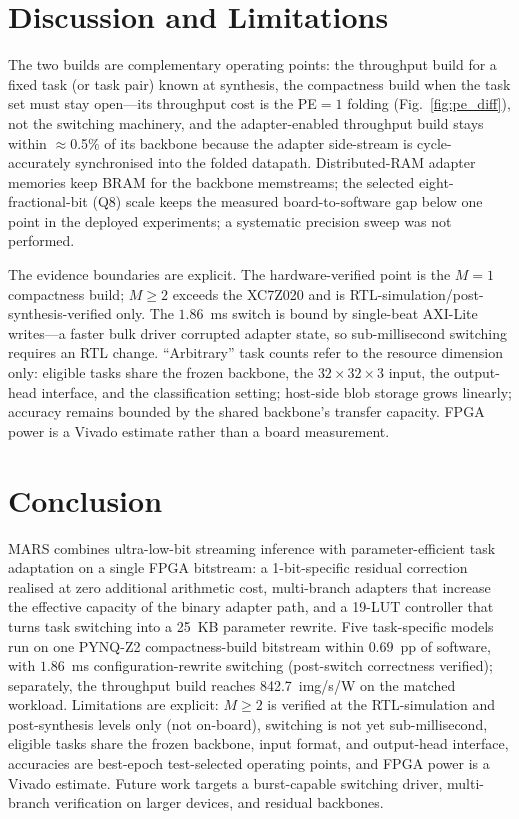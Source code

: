 \documentclass[conference]{IEEEtran}
\begin{document}
\section{Discussion and Limitations}
The two builds are complementary operating points: the throughput build for a fixed task (or task pair) known at synthesis, the compactness build when the task set must stay open---its throughput cost is the PE${=}1$ folding (Fig.~\ref{fig:pe_diff}), not the switching machinery, and the adapter-enabled throughput build stays within $\approx$0.5\% of its backbone because the adapter side-stream is cycle-accurately synchronised into the folded datapath. Distributed-RAM adapter memories keep BRAM for the backbone memstreams; the selected eight-fractional-bit (Q8) scale keeps the measured board-to-software gap below one point in the deployed experiments; a systematic precision sweep was not performed.

The evidence boundaries are explicit. The hardware-verified point is the $M{=}1$ compactness build; $M{\geq}2$ exceeds the XC7Z020 and is RTL-simulation/post-synthesis-verified only. The $1.86$~ms switch is bound by single-beat AXI-Lite writes---a faster bulk driver corrupted adapter state, so sub-millisecond switching requires an RTL change. ``Arbitrary'' task counts refer to the resource dimension only: eligible tasks share the frozen backbone, the $32{\times}32{\times}3$ input, the output-head interface, and the classification setting; host-side blob storage grows linearly; accuracy remains bounded by the shared backbone's transfer capacity. FPGA power is a Vivado estimate rather than a board measurement.

\section{Conclusion}
MARS combines ultra-low-bit streaming inference with parameter-efficient task adaptation on a single FPGA bitstream: a 1-bit-specific residual correction realised at zero additional arithmetic cost, multi-branch adapters that increase the effective capacity of the binary adapter path, and a 19-LUT controller that turns task switching into a 25~KB parameter rewrite. Five task-specific models run on one PYNQ-Z2 compactness-build bitstream within $0.69$~pp of software, with $1.86$~ms configuration-rewrite switching (post-switch correctness verified); separately, the throughput build reaches 842.7~img/s/W on the matched workload. Limitations are explicit: $M{\geq}2$ is verified at the RTL-simulation and post-synthesis levels only (not on-board), switching is not yet sub-millisecond, eligible tasks share the frozen backbone, input format, and output-head interface, accuracies are best-epoch test-selected operating points, and FPGA power is a Vivado estimate. Future work targets a burst-capable switching driver, multi-branch verification on larger devices, and residual backbones.
\end{document}
